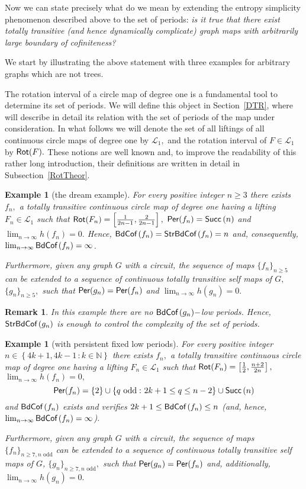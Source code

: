 \documentclass[a4paper, 11pt]{amsart}
\numberwithin{equation}{section}
\theoremstyle{customnumberedtheorem}
\theoremstyle{definitionwithbfnote}
\newtheorem{remark}[theorem]{Remark}
\newtheorem{example}[theorem]{Example}
\newcommand{\N}{\ensuremath{\mathbb{N}}}
\DeclareMathOperator{\bc}{\textsf{\upshape BdCof\,}}
\DeclareMathOperator{\sbc}{\textsf{\upshape StrBdCof\,}}
\DeclareMathOperator{\Per}{\textsf{\upshape Per}}
\DeclareMathOperator{\Rot}{\textsf{\upshape Rot}}
\DeclareMathOperator{\Succ}{\textsf{\upshape Succ}}
\newcommand{\dol}[1][1]{\ensuremath{\mathcal{L}_{#1}}}
\newcommand{\succs}[1]{\ensuremath{\Succ\left(#1\right)}}
\newcommand{\set}[2]{\ensuremath{\left\{#1 \,\colon #2\right\}}}
\begin{document}
Now we can state precisely what do we mean by extending the entropy
simplicity phenomenon described above to the set of periods:
\emph{is it true that there exist totally transitive (and hence
dynamically complicate) graph maps with arbitrarily large boundary of
cofiniteness?}

We start by illustrating the above statement with three examples
for arbitrary graphs which are not trees.

The rotation interval of a circle map of degree one is a fundamental
tool to determine its set of periods.
We will define this object in Section~\ref{DTR}, where will describe
in detail its relation with the set of periods of the map under
consideration.
In what follows we will denote the set of all liftings of all
continuous circle maps of degree  one by $\dol,$ and
the rotation interval of $F\in \dol$ by $\Rot(F).$
These notions are well known and,
to improve the readability of this rather long introduction,
their definitions are written in detail in Subsection~\ref{RotTheor}.

\begin{example}[the dream example]\label{exampleBCNintroduction}
For every positive integer $n \ge 3$ there exists $f_n,$
a totally transitive continuous circle map of degree one having a
lifting $F_n \in \dol$ such that
$\Rot(F_n) = \left[\tfrac{1}{2n-1}, \tfrac{2}{2n-1}\right],$
$\Per(f_n) = \succs{n}$ and
$\lim_{n\to\infty} h(f_n) = 0.$
Hence, $\bc(f_n) = \sbc(f_n) = n$ and, consequently,
$\lim_{n\to\infty} \bc(f_n) = \infty$.
\smallskip

Furthermore, given any graph $G$ with a circuit, the sequence of maps
$\{f_n\}_{n\ge 5}$ can be extended to a sequence of
continuous totally transitive self maps of $G,$ $\{g_n\}_{n\ge 5},$
such that $\Per(g_n) = \Per(f_n)$ and $\lim_{n\to\infty} h(g_n) = 0.$
\end{example}

\begin{remark}\label{rem:exampleBCNintroduction}
In this example there are no $\bc(g_n)-$low periods.
Hence, $\sbc(g_n)$ is enough to control the complexity of the set of periods.
\end{remark}

\begin{example}[with persistent fixed low periods]\label{examplefirstexamplebcnintroduction}
For every positive integer $n \in \set{4k+1, 4k-1}{k\in \N}$
there exists $f_n,$ a totally transitive continuous circle map
of degree one having a lifting $F_n \in \dol$ such that
$\Rot(F_n) = \left[\tfrac{1}{2}, \tfrac{n+2}{2n}\right],$
$\lim_{n\to\infty} h(f_n) = 0,$
\[
  \Per (f_n) = \{ 2\} \cup \set{q\ \text{odd}}{2k+1 \le q \le n-2} \cup  \succs{n}
\]
and $\bc(f_n)$ exists and verifies $2k+1 \le \bc(f_n) \le n$
(and, hence, $\lim_{n\to\infty} \bc(f_n) = \infty$).\smallskip

Furthermore, given any graph $G$ with a circuit, the sequence of maps
$\{f_n\}_{n\ge 7, n\text{ odd}}$ can be extended to a sequence
of continuous totally transitive self maps of $G$,
$\{g_n\}_{n\ge 7, n\text{ odd}},$
such that
$\Per(g_n) = \Per(f_n)$ and, additionally, $\lim_{n\to\infty} h(g_n) = 0.$
\end{example}
\end{document}
